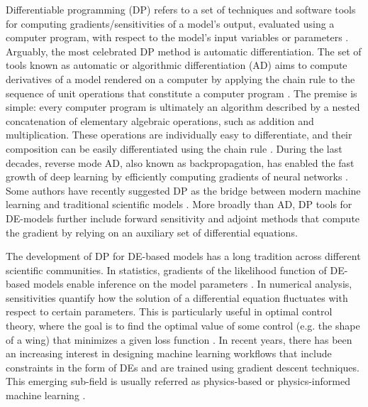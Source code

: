 Differentiable programming (DP) refers to a set of techniques and software tools for computing gradients/sensitivities of a model's output, evaluated using a computer program, with respect to the model's input variables or parameters \cite{Shen_diff_modelling, Innes_Zygote, blondel2024elements}.
Arguably, the most celebrated DP method is automatic differentiation.
The set of tools known as automatic or algorithmic differentiation (AD) aims to compute derivatives of a model rendered on a computer by applying the chain rule to the sequence of unit operations that constitute a computer program \cite{Griewank:2008kh, Naumann.2011}. 
The premise is simple: every computer program is ultimately an algorithm described by a nested concatenation of elementary algebraic operations, such as addition and multiplication.
These operations are individually easy to differentiate, and their composition can be easily differentiated using the chain rule \cite{Giering_Kaminski_1998}.
During the last decades, reverse mode AD, also known as backpropagation, has enabled the fast growth of deep learning by efficiently computing gradients of neural networks \cite{griewank2012invented}.
Some authors have recently suggested DP as the bridge between modern machine learning and traditional scientific models \cite{Ramsundar_Krishnamurthy_Viswanathan_2021, Shen_diff_modelling, Gelbrecht-differential-programming-Earth, rackauckas2021generalized}. 
More broadly than AD, DP tools for DE-models further include forward sensitivity and adjoint methods that compute the gradient by relying on an auxiliary set of differential equations.


The development of DP for DE-based models has a long tradition across different scientific communities.
In statistics, gradients of the likelihood function of DE-based models enable inference on the model parameters \cite{ramsay2017dynamic}. 
In numerical analysis, sensitivities quantify how the solution of a differential equation fluctuates with respect to certain parameters. 
This is particularly useful in optimal control theory, where the goal is to find the optimal value of some control (e.g. the shape of a wing) that minimizes a given loss function \cite{Giles_Pierce_2000}. 
In recent years, there has been an increasing interest in designing machine learning workflows that include constraints in the form of DEs and are trained using gradient descent techniques.
This emerging sub-field is usually referred as physics-based or physics-informed machine learning \cite{Karniadakis_Kevrekidis_Lu_Perdikaris_Wang_Yang_2021, thuerey2021pbdl, vadyala2022review}.

